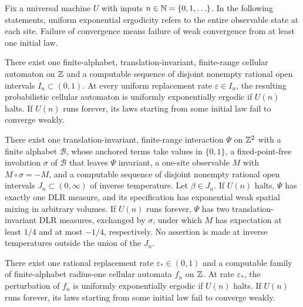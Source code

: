 Fix a universal machine \(U\) with inputs \(n\in\mathbb N=\{0,1,\ldots\}\). In the following statements, uniform exponential ergodicity refers to the entire observable state at each site. Failure of convergence means failure of weak convergence from at least one initial law.

\begin{theoremA}\label{thm:A}
There exist one finite-alphabet, translation-invariant, finite-range cellular automaton on \(\mathbb Z\) and a computable sequence of disjoint nonempty rational open intervals \(I_n\subset(0,1)\). At every uniform replacement rate \(\varepsilon\in I_n\), the resulting probabilistic cellular automaton is uniformly exponentially ergodic if \(U(n)\) halts. If \(U(n)\) runs forever, its laws starting from some initial law fail to converge weakly.
\end{theoremA}

\begin{theoremB}\label{thm:B}
There exist one translation-invariant, finite-range interaction \(\Psi\) on \(\mathbb Z^2\) with a finite alphabet \(\mathcal B\), whose anchored terms take values in \(\{0,1\}\), a fixed-point-free involution \(\sigma\) of \(\mathcal B\) that leaves \(\Psi\) invariant, a one-site observable \(M\) with \(M\circ\sigma=-M\), and a computable sequence of disjoint nonempty rational open intervals \(J_n\subset(0,\infty)\) of inverse temperature. Let \(\beta\in J_n\). If \(U(n)\) halts, \(\Psi\) has exactly one DLR measure, and its specification has exponential weak spatial mixing in arbitrary volumes. If \(U(n)\) runs forever, \(\Psi\) has two translation-invariant DLR measures, exchanged by \(\sigma\), under which \(M\) has expectation at least \(1/4\) and at most \(-1/4\), respectively. No assertion is made at inverse temperatures outside the union of the \(J_n\).
\end{theoremB}

\begin{theoremC}\label{thm:C}
There exist one rational replacement rate \(\varepsilon_*\in(0,1)\) and a computable family of finite-alphabet radius-one cellular automata \(f_n\) on \(\mathbb Z\). At rate \(\varepsilon_*\), the perturbation of \(f_n\) is uniformly exponentially ergodic if \(U(n)\) halts. If \(U(n)\) runs forever, its laws starting from some initial law fail to converge weakly.
\end{theoremC}

